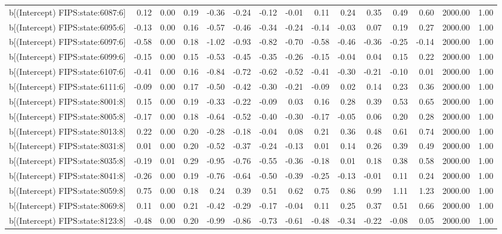 \begin{table}[ht]
\begin{tabular}{rrrrrrrrrrrrrrr}
  b[(Intercept) FIPS:state:6087:6] & 0.12 & 0.00 & 0.19 & -0.36 & -0.24 & -0.12 & -0.01 & 0.11 & 0.24 & 0.35 & 0.49 & 0.60 & 2000.00 & 1.00 \\ 
  b[(Intercept) FIPS:state:6095:6] & -0.13 & 0.00 & 0.16 & -0.57 & -0.46 & -0.34 & -0.24 & -0.14 & -0.03 & 0.07 & 0.19 & 0.27 & 2000.00 & 1.00 \\ 
  b[(Intercept) FIPS:state:6097:6] & -0.58 & 0.00 & 0.18 & -1.02 & -0.93 & -0.82 & -0.70 & -0.58 & -0.46 & -0.36 & -0.25 & -0.14 & 2000.00 & 1.00 \\ 
  b[(Intercept) FIPS:state:6099:6] & -0.15 & 0.00 & 0.15 & -0.53 & -0.45 & -0.35 & -0.26 & -0.15 & -0.04 & 0.04 & 0.15 & 0.22 & 2000.00 & 1.00 \\ 
  b[(Intercept) FIPS:state:6107:6] & -0.41 & 0.00 & 0.16 & -0.84 & -0.72 & -0.62 & -0.52 & -0.41 & -0.30 & -0.21 & -0.10 & 0.01 & 2000.00 & 1.00 \\ 
  b[(Intercept) FIPS:state:6111:6] & -0.09 & 0.00 & 0.17 & -0.50 & -0.42 & -0.30 & -0.21 & -0.09 & 0.02 & 0.14 & 0.23 & 0.36 & 2000.00 & 1.00 \\ 
  b[(Intercept) FIPS:state:8001:8] & 0.15 & 0.00 & 0.19 & -0.33 & -0.22 & -0.09 & 0.03 & 0.16 & 0.28 & 0.39 & 0.53 & 0.65 & 2000.00 & 1.00 \\ 
  b[(Intercept) FIPS:state:8005:8] & -0.17 & 0.00 & 0.18 & -0.64 & -0.52 & -0.40 & -0.30 & -0.17 & -0.05 & 0.06 & 0.20 & 0.28 & 2000.00 & 1.00 \\ 
  b[(Intercept) FIPS:state:8013:8] & 0.22 & 0.00 & 0.20 & -0.28 & -0.18 & -0.04 & 0.08 & 0.21 & 0.36 & 0.48 & 0.61 & 0.74 & 2000.00 & 1.00 \\ 
  b[(Intercept) FIPS:state:8031:8] & 0.01 & 0.00 & 0.20 & -0.52 & -0.37 & -0.24 & -0.13 & 0.01 & 0.14 & 0.26 & 0.39 & 0.49 & 2000.00 & 1.00 \\ 
  b[(Intercept) FIPS:state:8035:8] & -0.19 & 0.01 & 0.29 & -0.95 & -0.76 & -0.55 & -0.36 & -0.18 & 0.01 & 0.18 & 0.38 & 0.58 & 2000.00 & 1.00 \\ 
  b[(Intercept) FIPS:state:8041:8] & -0.26 & 0.00 & 0.19 & -0.76 & -0.64 & -0.50 & -0.39 & -0.25 & -0.13 & -0.01 & 0.11 & 0.24 & 2000.00 & 1.00 \\ 
  b[(Intercept) FIPS:state:8059:8] & 0.75 & 0.00 & 0.18 & 0.24 & 0.39 & 0.51 & 0.62 & 0.75 & 0.86 & 0.99 & 1.11 & 1.23 & 2000.00 & 1.00 \\ 
  b[(Intercept) FIPS:state:8069:8] & 0.11 & 0.00 & 0.21 & -0.42 & -0.29 & -0.17 & -0.04 & 0.11 & 0.25 & 0.37 & 0.51 & 0.66 & 2000.00 & 1.00 \\ 
  b[(Intercept) FIPS:state:8123:8] & -0.48 & 0.00 & 0.20 & -0.99 & -0.86 & -0.73 & -0.61 & -0.48 & -0.34 & -0.22 & -0.08 & 0.05 & 2000.00 & 1.00 \\ 

\end{tabular}
\end{table}
